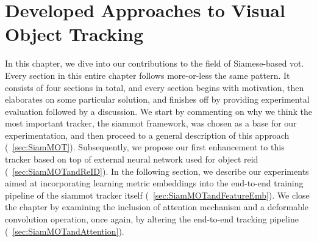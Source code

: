 \chapter{Developed Approaches to Visual Object Tracking}
\label{chap:DevelopedVisualTrackingApproaches}

In this chapter, we dive into our contributions to the field of Siamese-based \gls{vot}. Every section in this entire chapter follows more-or-less the same pattern. It consists of four sections in total, and every section begins with motivation, then elaborates on some particular solution, and finishes off by providing experimental evaluation followed by a discussion. We start by commenting on why we think the most important tracker, the \gls{siammot} framework, was chosen as a base for our experimentation, and then proceed to a general description of this approach (\sectiontext{}~\ref{sec:SiamMOT}). Subsequently, we propose our first enhancement to this tracker based on top of external neural network used for object \gls{reid} (\sectiontext{}~\ref{sec:SiamMOTandReID}). In the following section, we describe our experiments aimed at incorporating learning metric embeddings into the end-to-end training pipeline of the \gls{siammot} tracker itself (\sectiontext{}~\ref{sec:SiamMOTandFeatureEmb}). We close the chapter by examining the inclusion of attention mechanism and a deformable convolution operation, once again, by altering the end-to-end tracking pipeline (\sectiontext{}~\ref{sec:SiamMOTandAttention}).





